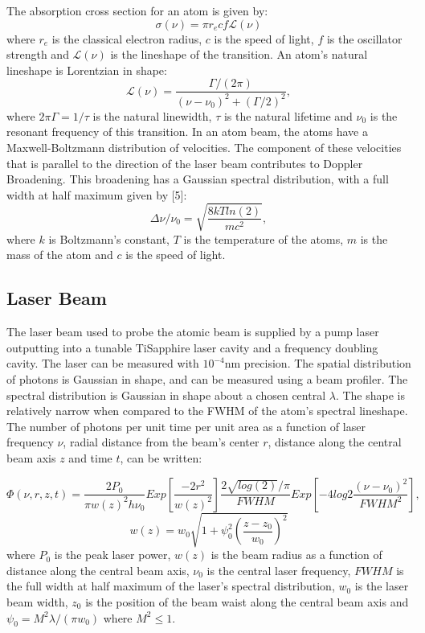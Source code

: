 \documentclass[12pt, a4paper]{article}
\begin{document}
The absorption cross section for an atom is given by:
\begin{equation}
\sigma(\nu) = \pi r_e c f \mathscr{L}(\nu)
\end{equation}
where $r_e$ is the classical electron radius, $c$ is the speed of light, $f$ is the oscillator strength and $\mathscr{L}(\nu)$ is the lineshape of the transition. An atom's natural lineshape is Lorentzian in shape:
\begin{equation}
\mathscr{L}(\nu) = \frac{\Gamma/(2 \pi)}{(\nu-\nu_0)^2+(\Gamma/2)^2},
\end{equation}
where $2 \pi \Gamma = 1/\tau$ is the natural linewidth, $\tau$ is the natural lifetime and $\nu_0$ is the resonant frequency of this transition. In an atom beam, the atoms have a Maxwell-Boltzmann distribution of velocities. The component of these velocities that is parallel to the direction of the laser beam contributes to Doppler Broadening. This broadening has a Gaussian spectral distribution, with a full width at half maximum given by [5]:
\begin{equation}
\Delta \nu / \nu_0 = \sqrt{\frac{8kT ln(2)}{mc^2}},
\end{equation}
where $k$ is Boltzmann's constant, $T$ is the temperature of the atoms, $m$ is the mass of the atom and $c$ is the speed of light.
\subsection{Laser Beam}
The laser beam used to probe the atomic beam is supplied by a pump laser outputting into a tunable TiSapphire laser cavity and a frequency doubling cavity. The laser can be measured with $10^{-4}$nm precision. The spatial distribution of photons is Gaussian in shape, and can be measured using a beam profiler. The spectral distribution is Gaussian in shape about a chosen central $\lambda$. The shape is relatively narrow when compared to the FWHM of the atom's spectral lineshape. The number of photons per unit time per unit area as a function of laser frequency $\nu$, radial distance from the beam's center $r$, distance along the central beam axis $z$ and time $t$, can be written:

\begin{equation}
\Phi(\nu,r,z,t) = \frac{2P_0}{\pi w(z)^2 h \nu_0} Exp[\frac{-2r^2}{w(z)^2}]\frac{2\sqrt{log(2)}/\pi}{FWHM}Exp[-4log{2}\frac{(\nu-\nu_0)^2}{FWHM^2}],
\end{equation}
\begin{equation}
w(z) = w_0\sqrt{1+\psi_0^2(\frac{z-z_0}{w_0})^2}
\end{equation}
where $P_0$ is the peak laser power, $w(z)$ is the beam radius as a function of distance along the central beam axis, $\nu_0$ is the central laser frequency, $FWHM$ is the full width at half maximum of the laser's spectral distribution, $w_0$ is the laser beam width, $z_0$ is the position of the beam waist along the central beam axis and $\psi_0 = M^2\lambda/(\pi w_0)$ where $M^2 \leq 1$. 
\end{document}
